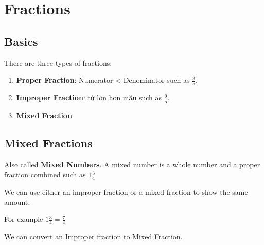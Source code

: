 \chapter{Fractions}

\section{Basics}

There are three types of fractions:

\begin{enumerate}
  \item \textbf{Proper Fraction}: Numerator < Denominator such as $\frac{3}{5}$.
  \item \textbf{Improper Fraction}: tử lớn hơn mẫu such as $\frac{9}{5}$.
  \item \textbf{Mixed Fraction}
\end{enumerate}

\section{Mixed Fractions}

Also called \textbf{Mixed Numbers}. A mixed number is a whole number and a proper fraction combined such as $1\frac{3}{4}$

We can use either an improper fraction or a mixed fraction to show the same amount.

For example $1\frac{3}{4}=\frac{7}{4}$

We can convert an Improper fraction to Mixed Fraction.
